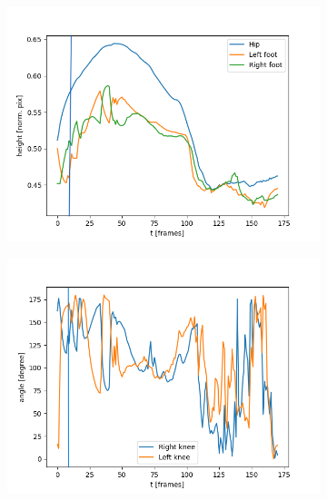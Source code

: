 \begin{figure}[h!]
\begin{subfigure}[b]{0.5\textwidth}
        \includegraphics*[scale=0.45]{jump_no_runup.png}
        \label{subfig:no_runup_height}
    \end{subfigure}
    \hfill
    \begin{subfigure}[b]{0.5\textwidth}
        \includegraphics*[scale=0.45]{jump_no_runup_angles.png}
        \label{subfig:no_runup_angles}
    \end{subfigure}
    \begin{subfigure}[b]{0.5\textwidth}

\end{subfigure}
\end{figure}

